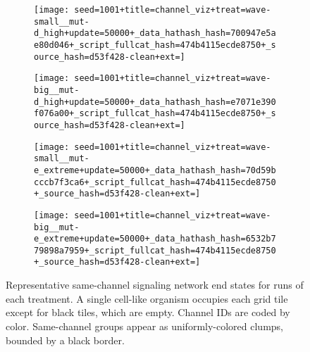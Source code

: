 \begin{figure}[!htbp]
\begin{center}
\begin{subfigure}[b]{0.45\columnwidth}
  \texttt{[image: seed=1001+title=channel\_viz+treat=wave-small\_\_mut-d\_high+update=50000+\_data\_hathash\_hash=700947e5ae80d046+\_script\_fullcat\_hash=474b4115ecde8750+\_source\_hash=d53f428-clean+ext=]}
\end{subfigure}
\begin{subfigure}[b]{0.45\columnwidth}
  \texttt{[image: seed=1001+title=channel\_viz+treat=wave-big\_\_mut-d\_high+update=50000+\_data\_hathash\_hash=e7071e390f076a00+\_script\_fullcat\_hash=474b4115ecde8750+\_source\_hash=d53f428-clean+ext=]}
\end{subfigure}

\begin{subfigure}[b]{0.45\columnwidth}
  \texttt{[image: seed=1001+title=channel\_viz+treat=wave-small\_\_mut-e\_extreme+update=50000+\_data\_hathash\_hash=70d59bcccb7f3ca6+\_script\_fullcat\_hash=474b4115ecde8750+\_source\_hash=d53f428-clean+ext=]}
\end{subfigure}
\begin{subfigure}[b]{0.45\columnwidth}
  \texttt{[image: seed=1001+title=channel\_viz+treat=wave-big\_\_mut-e\_extreme+update=50000+\_data\_hathash\_hash=6532b779898a7959+\_script\_fullcat\_hash=474b4115ecde8750+\_source\_hash=d53f428-clean+ext=]}
\end{subfigure}
\caption{
Representative same-channel signaling network end states for runs of each treatment.
A single cell-like organism occupies each grid tile except for black tiles, which are empty.
Channel IDs are coded by color.
Same-channel groups appear as uniformly-colored clumps, bounded by a black border.
}
\label{fig:outcome_grids}
\end{center}
\end{figure}
